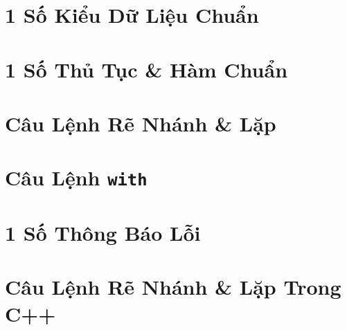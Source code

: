 \documentclass[oneside]{book}
\numberwithin{equation}{section}
\begin{document}
\section{1 Số Kiểu Dữ Liệu Chuẩn}

\section{1 Số Thủ Tục \& Hàm Chuẩn}

\section{Câu Lệnh Rẽ Nhánh \& Lặp}

\section{Câu Lệnh \texttt{with}}

\section{1 Số Thông Báo Lỗi}

\section{Câu Lệnh Rẽ Nhánh \& Lặp Trong C++}


\printbibliography[heading=bibintoc]
	
\end{document}
